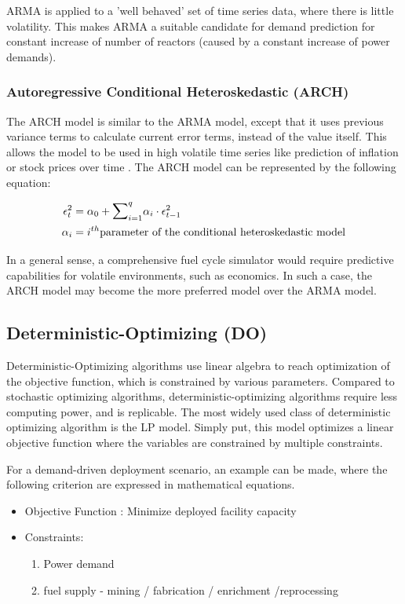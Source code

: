 \gls{ARMA} is applied to a 'well behaved' set of time series data,
where there is little volatility. This makes \gls{ARMA} a suitable
candidate for demand prediction for constant increase of number of
reactors (caused by a constant increase of power demands).


\subsubsection{Autoregressive Conditional Heteroskedastic (ARCH)}
The \gls{ARCH} model is similar to the \gls{ARMA} model, except that
it uses previous variance terms to calculate current error terms, instead
of the value itself. This allows the model to be used in high volatile 
time series like prediction of inflation or stock prices over time 
\cite{bollerslev_generalized_1986}.
The \gls{ARCH} model can be represented by the following equation:

\begin{align}
	\epsilon_t^2 &= \alpha_0+{\mathlarger{\sum}}_{i=1}^{q}\alpha_i\cdot\epsilon_{t-1}^2\\
	\alpha_i&= i^{th} \mbox{parameter of the conditional heteroskedastic model}
\end{align}


In a general sense, a comprehensive fuel cycle simulator would require
predictive capabilities for volatile environments, such as economics.
In such a case, the \gls{ARCH} model may become the more preferred model
over the \gls{ARMA} model.



\subsection{Deterministic-Optimizing (DO)}
Deterministic-Optimizing algorithms use linear algebra to
reach optimization of the objective function, which is
constrained by various parameters. Compared to stochastic
optimizing algorithms, deterministic-optimizing algorithms
require less computing power, and is replicable. The most
widely used class of deterministic optimizing algorithm
is the \gls{LP} model. Simply put, this model optimizes a
linear objective function where the variables are constrained
by multiple constraints.

For a demand-driven deployment scenario, an example can be made,
where the following criterion are expressed in mathematical equations.

\begin{itemize}
	\item[] Objective Function : Minimize deployed facility capacity
	\item[] Constraints:
	\begin{enumerate}
		\item Power demand
		\item fuel supply - mining / fabrication / enrichment /reprocessing
	\end{enumerate}
		
\end{itemize}



